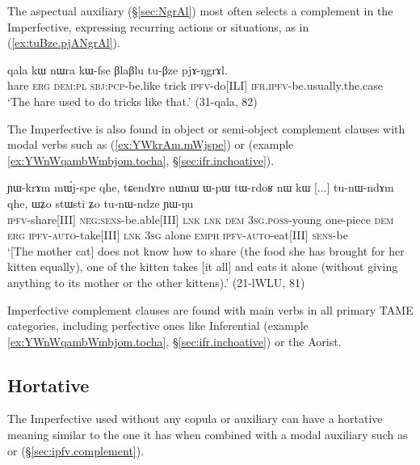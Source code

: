 The aspectual auxiliary  (§\ref{sec:NgrAl}) most often selects a complement in the Imperfective, expressing recurring actions or situations, as in (\ref{ex:tuBze.pjANgrAl}).

\begin{exe}
\ex \label{ex:tuBze.pjANgrAl}
\gll  qala kɯ nɯra kɯ-fse βlaβlu tu-βze pjɤ-ŋgrɤl. \\
hare \textsc{erg} \textsc{dem}:\textsc{pl} \textsc{sbj}:\textsc{pcp}-be.like trick \textsc{ipfv}-do[ILI] \textsc{ifr}.\textsc{ipfv}-be.usually.the.case \\
\glt `The hare used to do tricks like that.' (31-qala, 82)
\end{exe}

The Imperfective is also found in object or semi-object complement clauses with modal verbs such as  (\ref{ex:YWkrAm.mWjspe}) or  (example \ref{ex:YWnWqambWmbjom.tocha}, §\ref{sec:ifr.inchoative}).

\begin{exe}
\ex \label{ex:YWkrAm.mWjspe}
\gll ɲɯ-krɤm mɯ́j-spe qhe, tɕendɤre nɯnɯ ɯ-pɯ tɯ-rdoʁ nɯ kɯ [...] tu-nɯ-ndɤm qhe, ɯʑo stɯsti ʑo tu-nɯ-ndze ɲɯ-ŋu \\
\textsc{ipfv}-share[III] \textsc{neg}:\textsc{sens}-be.able[III] \textsc{lnk} \textsc{lnk} \textsc{dem} \textsc{3sg}.\textsc{poss}-young one-piece \textsc{dem} \textsc{erg} { } \textsc{ipfv}-\textsc{auto}-take[III] \textsc{lnk} \textsc{3sg} alone \textsc{emph} \textsc{ipfv}-\textsc{auto}-eat[III] \textsc{sens}-be \\
\glt `[The mother cat] does not know how to share (the food she has brought for her kitten equally), one of the kitten takes [it all] and eats it alone (without giving anything to its mother or the other kittens).' (21-lWLU, 81)
\end{exe}

Imperfective complement clauses are found with main verbs in all primary TAME categories, including perfective ones like Inferential (example \ref{ex:YWnWqambWmbjom.tocha}, §\ref{sec:ifr.inchoative}) or the Aorist.


\subsection{Hortative} \label{sec:ipfv.hortative}
The Imperfective used without any copula or auxiliary can have a hortative meaning similar to the one it has when combined with a modal auxiliary such as  or  (§\ref{sec:ipfv.complement}). 

